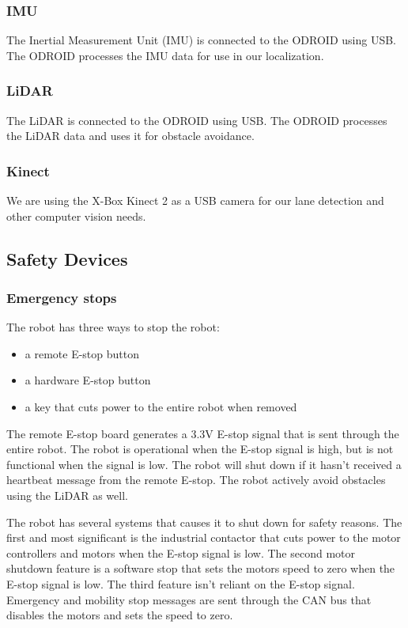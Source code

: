 \subsubsection{IMU}
The Inertial Measurement Unit (IMU) is connected to the ODROID using USB. The ODROID processes the IMU data for use in our localization.

\subsubsection{LiDAR}
The LiDAR is connected to the ODROID using USB. The ODROID processes the LiDAR data and uses it for obstacle avoidance.

\subsubsection{Kinect}
We are using the X-Box Kinect 2 as a USB camera for our lane detection and other computer vision needs.

\subsection{Safety Devices}
\subsubsection{Emergency stops}
The robot has three ways to stop the robot:
\begin{itemize}
    \item a remote E-stop button
    \item a hardware E-stop button
    \item a key that cuts power to the entire robot when removed
\end{itemize}

The remote E-stop board generates a 3.3V E-stop signal that is sent through the entire robot. The robot is operational when the E-stop signal is high, but is not functional when the signal is low. The robot will shut down if it hasn't received a heartbeat message from the remote E-stop. The robot actively avoid obstacles using the LiDAR as well.

The robot has several systems that causes it to shut down for safety reasons. The first and most significant is the industrial contactor that cuts power to the motor controllers and motors when the E-stop signal is low. The second motor shutdown feature is a software stop that sets the motors speed to zero when the E-stop signal is low. The third feature isn't reliant on the E-stop signal. Emergency and mobility stop messages are sent through the CAN bus that disables the motors and sets the speed to zero. 

